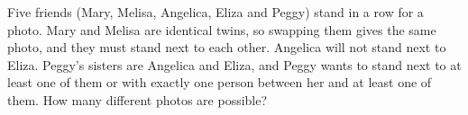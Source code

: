 Five friends (Mary, Melisa, Angelica, Eliza and Peggy) stand in a row for a photo. Mary and Melisa are identical twins, so swapping them gives the same photo, and they must stand next to each other. Angelica will not stand next to Eliza. Peggy's sisters are Angelica and Eliza, and Peggy wants to stand next to at least one of them or with exactly one person between her and at least one of them. How many different photos are possible?
